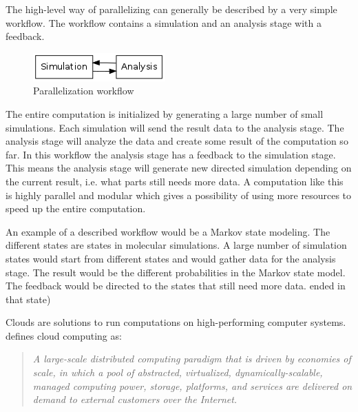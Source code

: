The high-level way of parallelizing can generally be described by a very
simple workflow. The workflow contains a simulation and an analysis
stage with a feedback. 

\begin{figure}[H]
  \centering
  \includegraphics{Chapters/IntroductionIncludes/workflow.png}
  \caption{Parallelization workflow}
  \label{fig:workflow}
\end{figure}

The entire computation is initialized by generating a large number of
small simulations. Each simulation will send the result data to the
analysis stage. The analysis stage will analyze the data and create
some result of the computation so far. In this workflow the analysis
stage has a feedback to the simulation stage. This means the analysis
stage will generate new directed simulation depending on the current
result, i.e. what parts still needs more data. A computation like this
is highly parallel and modular which gives a possibility of using more
resources to speed up the entire computation.

An example of a described workflow would be a Markov state
modeling. The different states are states in molecular simulations. A
large number of simulation states would start from different states
and would gather data for the analysis stage. The result would be the
different probabilities in the Markov state model. The feedback would
be directed to the states that still need more data.%
ended in that state)



Clouds are solutions to run computations on high-performing computer
systems. \citet{foster:2008} defines cloud computing as:

\begin{quote} \slshape
  A large-scale distributed computing paradigm that is driven by
  economies of scale, in which a pool of abstracted, virtualized,
  dynamically-scalable, managed computing power, storage, platforms,
  and services are delivered on demand to external customers over
  the Internet.
\end{quote}

